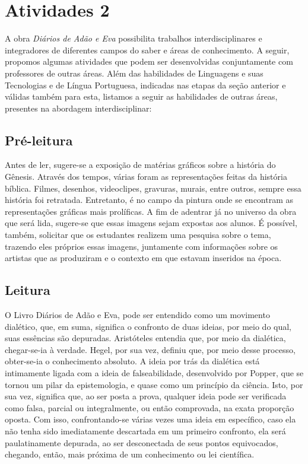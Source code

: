 \documentclass[12pt]{extarticle}
\begin{document}

\section{Atividades 2}


A obra \emph{Diários de Adão e Eva} possibilita trabalhos
interdisciplinares e integradores de diferentes campos do saber e áreas
de conhecimento. A seguir, propomos algumas atividades que podem ser
desenvolvidas conjuntamente com professores de outras áreas. Além das
habilidades de Linguagens e suas Tecnologias e de Língua Portuguesa,
indicadas nas etapas da seção anterior e válidas também para esta,
listamos a seguir as habilidades de outras áreas, presentes na abordagem
interdisciplinar:

\subsection{Pré-leitura}

Antes de ler, sugere-se a exposição de matérias gráficos
sobre a história do Gênesis. Através dos tempos, várias foram as
representações feitas da história bíblica. Filmes, desenhos,
videoclipes, gravuras, murais, entre outros, sempre essa história foi
retratada. Entretanto, é no campo da pintura onde se encontram as
representações gráficas mais prolíficas. A fim de adentrar já no
universo da obra que será lida, sugere-se que essas imagens sejam
expostas aos alunos. É possível, também, solicitar que os estudantes
realizem uma pesquisa sobre o tema, trazendo eles próprios essas
imagens, juntamente com informações sobre os artistas que as produziram
e o contexto em que estavam inseridos na época.

\subsection{Leitura}

O Livro Diários de Adão e Eva, pode ser entendido como um
movimento dialético, que, em suma, significa o confronto de duas ideias,
por meio do qual, suas essências são depuradas. Aristóteles entendia
que, por meio da dialética, chegar-se-ia à verdade. Hegel, por sua vez,
definiu que, por meio desse processo, obter-se-ia o conhecimento
absoluto. A ideia por trás da dialética está intimamente ligada com a
ideia de falseabilidade, desenvolvido por Popper, que se tornou um pilar
da epistemologia, e quase como um princípio da ciência. Isto, por sua
vez, significa que, ao ser posta a prova, qualquer ideia pode ser
verificada como falsa, parcial ou integralmente, ou então comprovada, na
exata proporção oposta. Com isso, confrontando-se várias vezes uma ideia
em específico, caso ela não tenha sido imediatamente descartada em um
primeiro confronto, ela será paulatinamente depurada, ao ser
desconectada de seus pontos equivocados, chegando, então, mais próxima
de um conhecimento ou lei científica.
\end{document}
